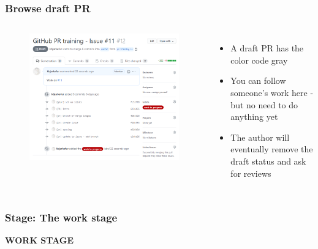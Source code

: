 \documentclass[aspectratio=169]{beamer} %
\begin{document}
\begin{frame}
	\frametitle{Browse draft PR}
	\begin{columns}[c]
		
		\vspace{-.5cm}
		\begin{figure}
			\centering
			\includegraphics[width=\textwidth]{./img/create-pr-2.png}
		\end{figure}
		
		
		\begin{itemize}
			\setlength\itemsep{1em}
			\item A draft PR has the color code gray 
			\item You can follow someone's work here - but no need to do anything yet
			\item The author will eventually remove the draft status and ask for reviews
		\end{itemize}
		
	\end{columns}	
\end{frame}

\begin{frame}
	\frametitle{Stage: The work stage}
	
	\huge\centering \textbf{WORK STAGE}
	
\end{frame}
\end{document}
